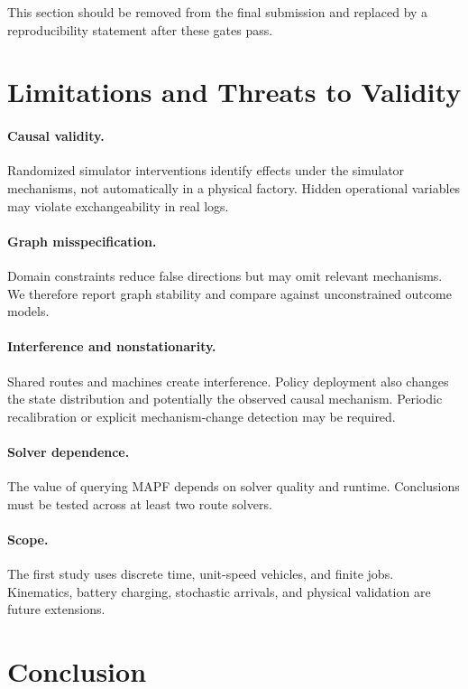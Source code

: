 \documentclass[11pt,a4paper]{article}
\begin{document}
This section should be removed from the final submission and replaced by a
reproducibility statement after these gates pass.

\section{Limitations and Threats to Validity}
\label{sec:limitations}

\paragraph{Causal validity.}
Randomized simulator interventions identify effects under the simulator
mechanisms, not automatically in a physical factory. Hidden operational
variables may violate exchangeability in real logs.

\paragraph{Graph misspecification.}
Domain constraints reduce false directions but may omit relevant mechanisms.
We therefore report graph stability and compare against unconstrained outcome
models.

\paragraph{Interference and nonstationarity.}
Shared routes and machines create interference. Policy deployment also changes
the state distribution and potentially the observed causal mechanism. Periodic
recalibration or explicit mechanism-change detection may be required.

\paragraph{Solver dependence.}
The value of querying MAPF depends on solver quality and runtime. Conclusions
must be tested across at least two route solvers.

\paragraph{Scope.}
The first study uses discrete time, unit-speed vehicles, and finite jobs.
Kinematics, battery charging, stochastic arrivals, and physical validation are
future extensions.

\section{Conclusion}
\label{sec:conclusion}
\end{document}
